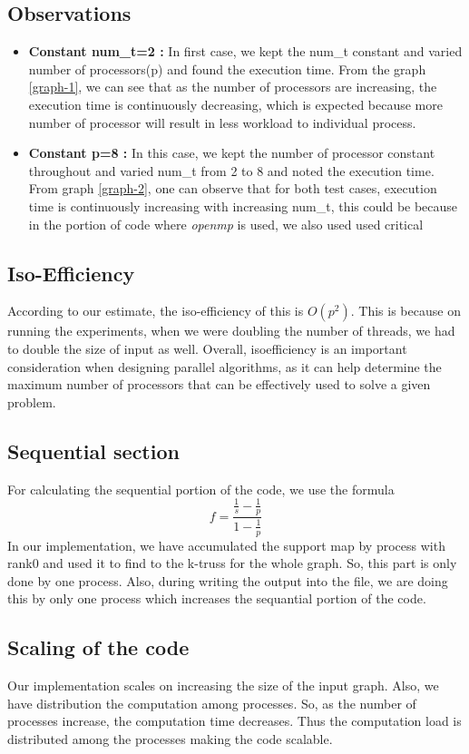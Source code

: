 \documentclass[12pt,a4paper]{article}
\begin{document}
\subsection{Observations} 
\begin{itemize}
    \item \textbf{Constant num\_t=2 :} In first case, we kept the num\_t constant and varied number of processors(p) and found the execution time. From the graph \ref{graph-1}, we can see that as the number of processors are increasing, the execution time is continuously decreasing, which is expected because more number of processor will result in less workload to individual process.

    \item \textbf{Constant p=8 :} In this case, we kept the number of processor constant throughout and varied num\_t from 2 to 8 and noted the execution time. From graph \ref{graph-2}, one can observe that for both test cases, execution time is continuously increasing with increasing num\_t, this could be because in the portion of code where \textit{openmp} is used, we also used used critical 
\end{itemize}

\subsection{Iso-Efficiency}
According to our estimate, the iso-efficiency of this is $O(p^{2})$. This is because on running the experiments, when we were doubling the number of threads, we had to double the size of input as well. Overall, isoefficiency is an important consideration when designing parallel algorithms, as it can help determine the maximum number of processors that can be effectively used to solve a given problem.

\subsection{Sequential section}
For calculating the sequential portion of the code, we use the formula 
$$f = \frac{\frac{1}{s} - \frac{1}{p}}{1 - \frac{1}{p}}$$ 
In our implementation, we have accumulated the support map by process with rank0 and used it to find to the k-truss for the whole graph. So, this part is only done by one process. 
Also, during writing the output into the file, we are doing this by only one process which increases the sequantial portion of the code.

\subsection{Scaling of the code}
Our implementation scales on increasing the size of the input graph. Also, we have distribution the computation among processes. So, as the number of processes increase, the computation time decreases. Thus the computation load is distributed among the processes making the code scalable.
\end{document}
